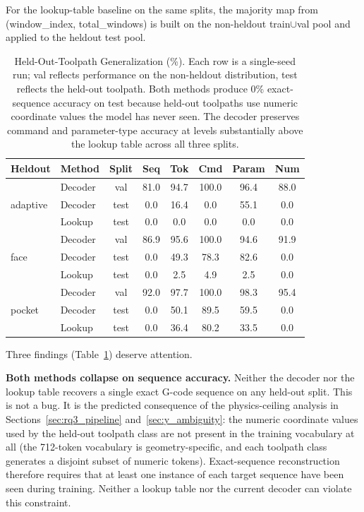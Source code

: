 \documentclass[sensors,article,submit,moreauthors,pdftex]{Definitions/mdpi}
\begin{document}
For the lookup-table baseline on the same splits, the majority map from (window\_index, total\_windows) is built on the non-heldout train$\cup$val pool and applied to the heldout test pool.

\begin{table}[htbp]
\centering
\caption{Held-Out-Toolpath Generalization (\%). Each row is a single-seed run; val reflects performance on the non-heldout distribution, test reflects the held-out toolpath. Both methods produce 0\% exact-sequence accuracy on test because held-out toolpaths use numeric coordinate values the model has never seen. The decoder preserves command and parameter-type accuracy at levels substantially above the lookup table across all three splits.}
\label{tab:ood}
\small
\begin{tabular}{@{}llcccccc@{}}
\toprule
\textbf{Heldout} & \textbf{Method} & \textbf{Split} & \textbf{Seq} & \textbf{Tok} & \textbf{Cmd} & \textbf{Param} & \textbf{Num} \\
\midrule
\multirow{3}{*}{adaptive}
& Decoder & val  & 81.0 & 94.7 & 100.0 & 96.4 & 88.0 \\
& Decoder & test & 0.0  & 16.4 & 0.0   & 55.1 & 0.0 \\
& Lookup  & test & 0.0  & 0.0  & 0.0   & 0.0  & 0.0 \\
\midrule
\multirow{3}{*}{face}
& Decoder & val  & 86.9 & 95.6 & 100.0 & 94.6 & 91.9 \\
& Decoder & test & 0.0  & 49.3 & 78.3  & 82.6 & 0.0 \\
& Lookup  & test & 0.0  & 2.5  & 4.9   & 2.5  & 0.0 \\
\midrule
\multirow{3}{*}{pocket}
& Decoder & val  & 92.0 & 97.7 & 100.0 & 98.3 & 95.4 \\
& Decoder & test & 0.0  & 50.1 & 89.5  & 59.5 & 0.0 \\
& Lookup  & test & 0.0  & 36.4 & 80.2  & 33.5 & 0.0 \\
\bottomrule
\end{tabular}
\normalsize
\end{table}

Three findings (Table~\ref{tab:ood}) deserve attention.

\textbf{Both methods collapse on sequence accuracy.} Neither the decoder nor the lookup table recovers a single exact G-code sequence on any held-out split. This is not a bug. It is the predicted consequence of the physics-ceiling analysis in Sections~\ref{sec:rq3_pipeline} and~\ref{sec:y_ambiguity}: the numeric coordinate values used by the held-out toolpath class are not present in the training vocabulary at all (the 712-token vocabulary is geometry-specific, and each toolpath class generates a disjoint subset of numeric tokens). Exact-sequence reconstruction therefore requires that at least one instance of each target sequence have been seen during training. Neither a lookup table nor the current decoder can violate this constraint.
\end{document}
